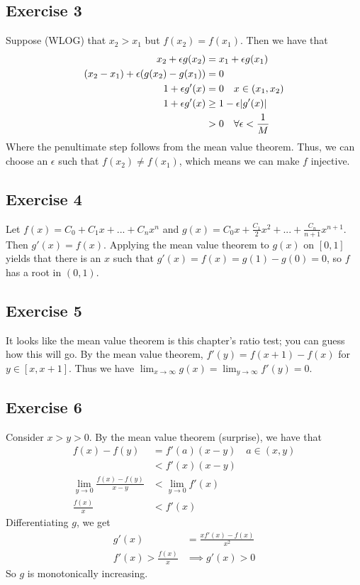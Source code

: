 \subsection{Exercise 3}
Suppose (WLOG) that $x_2 > x_1$ but $f(x_2) = f(x_1)$. Then we have that
\begin{align*}
        x_2 + \epsilon g(x_2) &= x_1 + \epsilon g(x_1) \\
        (x_2 - x_1) + \epsilon (g(x_2) - g(x_1)) &= 0 \\
        1 + \epsilon g'(x) &= 0 \quad x \in (x_1, x_2) \\
        1 + \epsilon g'(x) &\geq 1 - \epsilon \abs{g'(x)} \\
                           &> 0 \quad \forall \epsilon < \frac{1}{M}
\end{align*}
Where the penultimate step follows from the mean value theorem.
Thus, we can choose an $\epsilon$ such that $f(x_2) \neq f(x_1)$, which means we can make $f$ injective.

\subsection{Exercise 4}
Let $f(x) = C_0 + C_1 x + ... + C_n x^n$ and $g(x) = C_0 x + \frac{C_1}{2} x^2 + ... + \frac{C_n}{n+1}x^{n+1}$.
Then $g'(x) = f(x)$. Applying the mean value theorem to $g(x)$ on $[0, 1]$ yields that there is an $x$ 
such that $g'(x) = f(x) = g(1) - g(0) = 0$, so $f$ has a root in $(0, 1)$.

\subsection{Exercise 5}
It looks like the mean value theorem is this chapter's ratio test; you can guess how this will go.
By the mean value theorem, $f'(y) = f(x + 1) - f(x)$ for $y \in [x, x+1]$. Thus we have
$\lim_{x \to \infty} g(x) = \lim_{y \to \infty} f'(y) = 0$.

\subsection{Exercise 6}
Consider $x > y > 0$. By the mean value theorem (surprise), we have that
\begin{align*}
        f(x) - f(y) &= f'(a) (x - y) \quad a \in (x, y) \\
                    &< f'(x) (x - y) \\
        \lim_{y \to 0} \frac{f(x) - f(y)}{x - y} &< \lim_{y \to 0} f'(x) \\
        \frac{f(x)}{x} &< f'(x)
\end{align*}
Differentiating $g$, we get
\begin{align*}
        g'(x) &= \frac{xf'(x) - f(x)}{x^2} \\
        f'(x) > \frac{f(x)}{x} &\implies g'(x) > 0
\end{align*}
So $g$ is monotonically increasing.


